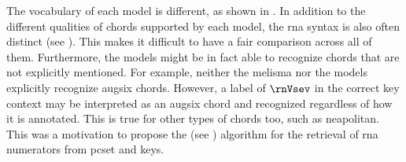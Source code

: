 
The vocabulary of each model is different, as shown in
. In addition to the different
qualities of chords supported by each model, the \gls{rna}
syntax is also often distinct (see
). This
makes it difficult to have a fair comparison across all of
them. Furthermore, the models might be in fact able to
recognize chords that are not explicitly mentioned. For
example, neither the \gls{melisma} nor the
\textcite{mcleod2021modular} models explicitly recognize
\gls{augsix} chords. However, a label of $\rnVsev$ in the
correct key context may be interpreted as an \gls{augsix}
chord and recognized regardless of how it is annotated. This
is true for other types of chords too, such as
\gls{neapolitan}. This was a motivation to propose the
\algorithmrn{} (see
)
algorithm for the retrieval of \gls{rna} numerators from
\gls{pcset} and keys. 

